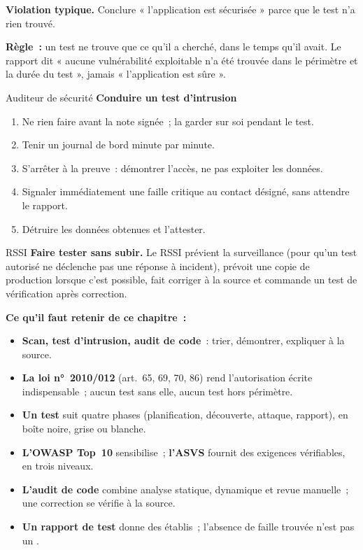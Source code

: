 \begin{boxalert}
\textbf{Violation typique.} Conclure « l'application est sécurisée » parce
que le test n'a rien trouvé.

\smallskip
\textbf{Règle~:} un test ne trouve que ce qu'il a cherché, dans le temps
qu'il avait. Le rapport dit « aucune vulnérabilité exploitable n'a été
trouvée dans le périmètre et la durée du test », jamais « l'application est
sûre ».
\end{boxalert}

\begin{boxmetier}{Auditeur de sécurité}
\textbf{Conduire un test d'intrusion}
\begin{enumerate}
    \item Ne rien faire avant la note signée~; la garder sur soi pendant
          le test.
    \item Tenir un journal de bord minute par minute.
    \item S'arrêter à la preuve~: démontrer l'accès, ne pas exploiter les
          données.
    \item Signaler immédiatement une faille critique au contact désigné,
          sans attendre le rapport.
    \item Détruire les données obtenues et l'attester.
\end{enumerate}
\end{boxmetier}

\begin{boxmetier}{RSSI}
\textbf{Faire tester sans subir.} Le RSSI prévient la surveillance
(pour qu'un test autorisé ne déclenche pas une réponse à incident), prévoit
une copie de production lorsque c'est possible, fait corriger à la source
et commande un test de vérification après correction.
\end{boxmetier}

\separateur

\begin{boxresume}
\textbf{Ce qu'il faut retenir de ce chapitre~:}
\begin{itemize}
    \item \textbf{Scan, test d'intrusion, audit de code}~: trier, démontrer,
          expliquer à la source.
    \item \textbf{La loi n°~2010/012} (art.~65, 69, 70, 86) rend
          l'autorisation écrite indispensable~; aucun test sans elle,
          aucun test hors périmètre.
    \item \textbf{Un test} suit quatre phases (planification, découverte,
          attaque, rapport), en boîte noire, grise ou blanche.
    \item \textbf{L'OWASP Top~10} sensibilise~; \textbf{l'ASVS} fournit
          des exigences vérifiables, en trois niveaux.
    \item \textbf{L'audit de code} combine analyse statique, dynamique et
          revue manuelle~; une correction se vérifie à la source.
    \item \textbf{Un rapport de test} donne des \NON{} établis~; l'absence
          de faille trouvée n'est pas un \OUI{}.
\end{itemize}
\end{boxresume}

